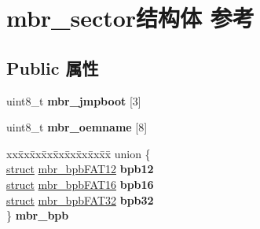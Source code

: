 \hypertarget{structmbr__sector}{}\section{mbr\+\_\+sector结构体 参考}
\label{structmbr__sector}
\subsection*{Public 属性}
\begin{DoxyCompactItemize}
\item 
\mbox{\label{structmbr__sector_af14f9df3fcc2b3db2569547575bc95a2}} 
uint8\+\_\+t {\bfseries mbr\+\_\+jmpboot} \mbox{[}3\mbox{]}
\item 
\mbox{\label{structmbr__sector_a3f517add1bab774964c9345c627c8e3a}} 
uint8\+\_\+t {\bfseries mbr\+\_\+oemname} \mbox{[}8\mbox{]}
\item 
\mbox{\label{structmbr__sector_a8dd0a14f1fc6602036f9acb1d6a51923}} 
\begin{tabbing}
xx\=xx\=xx\=xx\=xx\=xx\=xx\=xx\=xx\=\kill
union \{\\
\>\hyperlink{interfacestruct}{struct} \hyperlink{structmbr__bpb_f_a_t12}{mbr\_bpbFAT12} {\bfseries bpb12}\\
\>\hyperlink{interfacestruct}{struct} \hyperlink{structmbr__bpb_f_a_t16}{mbr\_bpbFAT16} {\bfseries bpb16}\\
\>\hyperlink{interfacestruct}{struct} \hyperlink{structmbr__bpb_f_a_t32}{mbr\_bpbFAT32} {\bfseries bpb32}\\
\} {\bfseries mbr\_bpb}\\


\end{tabbing}
\end{DoxyCompactItemize}
